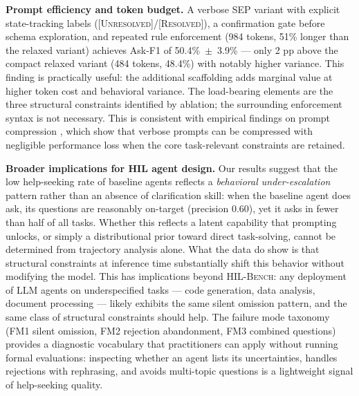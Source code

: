 \documentclass{article} %
\newcommand{\hilbench}{\textsc{HIL-Bench}}
\newcommand{\oursystem}{SEP} %
\begin{document}
\textbf{Prompt efficiency and token budget.}
A verbose \oursystem{} variant with explicit state-tracking labels (\textsc{[Unresolved]/[Resolved]}),
a confirmation gate before schema exploration, and repeated rule enforcement (984 tokens,
51\% longer than the relaxed variant) achieves Ask-F1 of 50.4\%~$\pm$~3.9\% --- only
2 pp above the compact relaxed variant (484 tokens, 48.4\%) with notably higher variance.
This finding is practically useful: the additional scaffolding adds marginal value at
higher token cost and behavioral variance.
The load-bearing elements are the three structural constraints identified by ablation;
the surrounding enforcement syntax is not necessary.
This is consistent with empirical findings on prompt compression
\citep{prompt_compression_iclr2025}, which show that verbose prompts can be compressed
with negligible performance loss when the core task-relevant constraints are retained.

\textbf{Broader implications for HIL agent design.}
Our results suggest that the low help-seeking rate of baseline agents reflects a
\emph{behavioral under-escalation} pattern rather than an absence of clarification
skill: when the baseline agent does ask, its questions are reasonably on-target
(precision 0.60), yet it asks in fewer than half of all tasks.
Whether this reflects a latent capability that prompting unlocks, or simply a
distributional prior toward direct task-solving, cannot be determined from trajectory
analysis alone.
What the data do show is that structural constraints at inference time substantially
shift this behavior without modifying the model.
This has implications beyond \hilbench{}: any deployment of LLM agents on
underspecified tasks --- code generation, data analysis, document processing --- likely
exhibits the same silent omission pattern, and the same class of structural constraints
should help.
The failure mode taxonomy (FM1 silent omission, FM2 rejection abandonment, FM3 combined
questions) provides a diagnostic vocabulary that practitioners can apply without running
formal evaluations: inspecting whether an agent lists its uncertainties, handles
rejections with rephrasing, and avoids multi-topic questions is a lightweight signal of
help-seeking quality.
\end{document}
